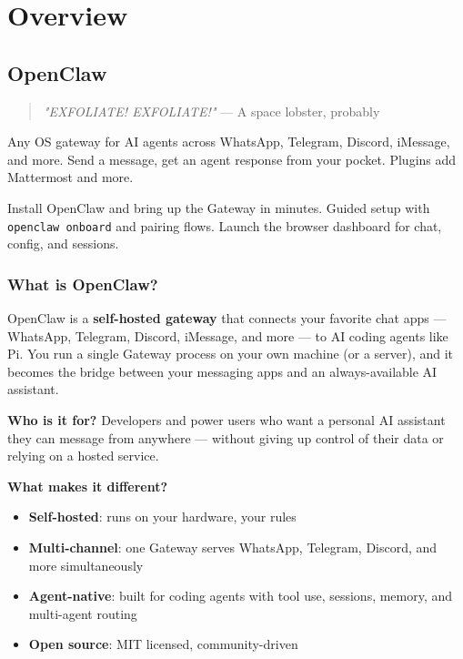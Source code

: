 \chapter{Overview}

\section{OpenClaw}



\begin{quote}
\textit{"EXFOLIATE! EXFOLIATE!"} — A space lobster, probably
\end{quote}


Any OS gateway for AI agents across WhatsApp, Telegram, Discord, iMessage, and more.
Send a message, get an agent response from your pocket. Plugins add Mattermost and more.

Install OpenClaw and bring up the Gateway in minutes.
Guided setup with \texttt{openclaw onboard} and pairing flows.
Launch the browser dashboard for chat, config, and sessions.

\subsection{What is OpenClaw?}


OpenClaw is a \textbf{self-hosted gateway} that connects your favorite chat apps — WhatsApp, Telegram, Discord, iMessage, and more — to AI coding agents like Pi. You run a single Gateway process on your own machine (or a server), and it becomes the bridge between your messaging apps and an always-available AI assistant.

\textbf{Who is it for?} Developers and power users who want a personal AI assistant they can message from anywhere — without giving up control of their data or relying on a hosted service.

\textbf{What makes it different?}

\begin{itemize}
  \item \textbf{Self-hosted}: runs on your hardware, your rules
  \item \textbf{Multi-channel}: one Gateway serves WhatsApp, Telegram, Discord, and more simultaneously
  \item \textbf{Agent-native}: built for coding agents with tool use, sessions, memory, and multi-agent routing
  \item \textbf{Open source}: MIT licensed, community-driven
\end{itemize}


